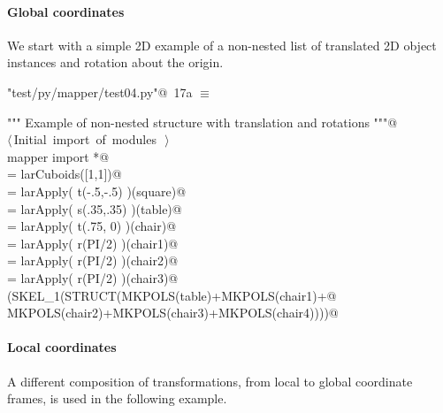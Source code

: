 \documentclass[11pt,oneside]{article}	%
\begin{document}
\paragraph{Global coordinates}
We start with a simple 2D example of a non-nested list of translated 2D object instances and rotation about the origin.

\begin{flushleft} \small \label{scrap31}
\protect{}\verb@"test/py/mapper/test04.py"@\nobreak\ {\footnotesize 17a }$\equiv$
\vspace{-1ex}
\begin{list}{}{} \item
\mbox{}\verb@""" Example of non-nested structure with translation and rotations """@\\
\mbox{}\verb@@\hbox{$\langle\,$Initial import of modules\nobreak\ {\footnotesize {}}$\,\rangle$}\verb@@\\
\mbox{}\verb@from mapper import *@\\
\mbox{}\verb@square = larCuboids([1,1])@\\
\mbox{}\verb@table = larApply( t(-.5,-.5) )(square)@\\
\mbox{}\verb@chair = larApply( s(.35,.35) )(table)@\\
\mbox{} = larApply( t(.75, 0) )(chair)@\\
\mbox{} = larApply( r(PI/2) )(chair1)@\\
\mbox{} = larApply( r(PI/2) )(chair2)@\\
\mbox{} = larApply( r(PI/2) )(chair3)@\\
\mbox{}\verb@VIEW(SKEL_1(STRUCT(MKPOLS(table)+MKPOLS(chair1)+@\\
\mbox{}\verb@               MKPOLS(chair2)+MKPOLS(chair3)+MKPOLS(chair4))))@\\
\mbox{}\verb@@{\NWsep}
\end{list}
\vspace{-2ex}
\end{flushleft}

\paragraph{Local coordinates}
A different composition of transformations, from local to global coordinate frames, is used in the following example.
\end{document}
